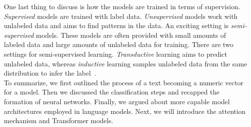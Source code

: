 One last thing to discuss is how the models are trained in terms of supervision. \emph{Supervised} models are trained with label data. \emph{Unsupervised} models work with unlabeled data and aims to find patterns in the data. An exciting setting is \emph{semi-supervised} models. These models are often provided with small amounts of labeled data and large amounts of unlabeled data for training. There are two settings for semi-supervised learning. \emph{Transductive} learning aims to predict unlabeled data, whereas \emph{inductive} learning samples unlabeled data from the same distribution to
infer the label~\parencite{LearningByTransduction_Gammerman}.\\
To summarize, we first outlined the process of a text becoming a numeric vector for a model. Then we discussed the classification steps and recapped the formation of neural networks. Finally, we argued about more capable model architectures employed in language models. Next, we will introduce the attention mechanism and Transformer models.

